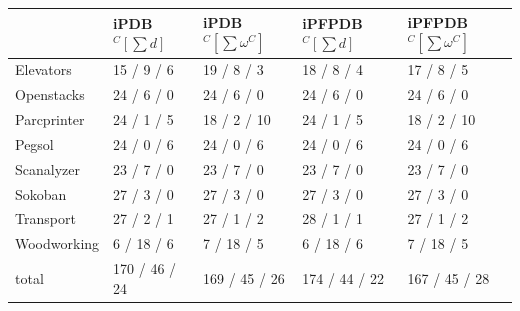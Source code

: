 \documentclass[letterpaper]{article} %
\begin{document}
\begin{table}
\begin{tabular}{| l | l | l | l | l |}
\hline
             & iPDB\(^C[\sum d]\)  & iPDB\(^C[\sum \omega^C]\)  & iPFPDB\(^C[\sum d]\)  &  iPFPDB\(^C[\sum \omega^C]\)\\
\hline
Elevators    & 15 / 9 / 6        & 19 / 8 / 3        & 18 / 8 / 4          & 17 / 8 / 5 \\
Openstacks   & 24 / 6 / 0        & 24 / 6 / 0        & 24 / 6 / 0          & 24 / 6 / 0 \\
Parcprinter  & 24 / 1 / 5        & 18 / 2 / 10       & 24 / 1 / 5          & 18 / 2 / 10 \\
Pegsol       & 24 / 0 / 6        & 24 / 0 / 6        & 24 / 0 / 6          & 24 / 0 / 6 \\
Scanalyzer   & 23 / 7 / 0        & 23 / 7 / 0        & 23 / 7 / 0          & 23 / 7 / 0 \\ 
Sokoban      & 27 / 3 / 0        & 27 / 3 / 0        & 27 / 3 / 0          & 27 / 3 / 0 \\
Transport    & 27 / 2 / 1        & 27 / 1 / 2        & 28 / 1 / 1          & 27 / 1 / 2 \\ 
Woodworking  & 6 / 18 / 6        & 7 / 18 / 5        & 6 / 18 / 6          & 7 / 18 / 5 \\
\hline
total        & 170 / 46 / 24     & 169 / 45 / 26     & 174 / 44 / 22       & 167 / 45 / 28 \\
\hline
\end{tabular}

\end{table}
\end{document}
